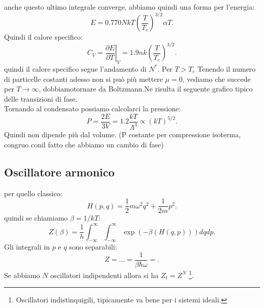anche questo ultimo integrale converge, abbiamo quindi una forma per l'energia:
\[
	E = 0.770 NkT \left( \frac{T}{T_{c}} \right) ^{3 /2} \alpha T
.\] 
Quindi il calore specifico:
\[
	C_{V}= \left.\frac{\partial E}{\partial T} \right|_{V} = 1.9 nk \left( \frac{T}{T_{c}} \right) ^{3 /2}
.\] 
quindi il calore specifico segue l'andamento di $N^{*}$. 
Per $T > T_{c}$ Tenendo il numero di particelle costanti adesso non si può più mettere $\mu = 0$, vediamo che succede per $T\to \infty$, dobbiamotornare da Boltzmann.Ne risulta il seguente grafico tipico delle transizioni di fase.\\
Tornando al condensato possiamo calcolarci la pressione: 
 \[
	 P = \frac{2E}{3V} = 1.2 \frac{kT}{\Lambda ^3} \propto \left( kT \right) ^{5 /2} 
.\] 
Quindi non dipende più dal volume. (P costante per compressione isoterma, congruo conil fatto che abbiamo un cambio di fase)
\subsection{Oscillatore armonico}%
per quello classico:
\[
	H( p,q) = \frac{1}{2}m\omega ^2q^2 + \frac{1}{2m}p^2
.\] 
quindi se chiamiamo $\beta  = 1 /kT$:
\[
	Z( \beta )  = \frac{1}{h}\int_{-\infty}^{\infty} \int_{-\infty}^{\infty} \exp\left( -\beta \left( H( q,p)  \right)  \right) dqdp  
.\] 
Gli integrali in $p$ e $q$ sono separabili:
\[
	Z = \ldots = \frac{1}{\beta \hbar\omega } = 
.\] 
Se abbiamo $N$ oscillatori indipendenti allora si ha $Z_{t} = Z^{N}$ \footnote{Oscillatori indistinquigili, tipicamente va bene per i sistemi ideali.}.

